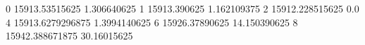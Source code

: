 0 15913.53515625 1.306640625
1 15913.390625 1.162109375
2 15912.228515625 0.0
4 15913.6279296875 1.3994140625
6 15926.37890625 14.150390625
8 15942.388671875 30.16015625
